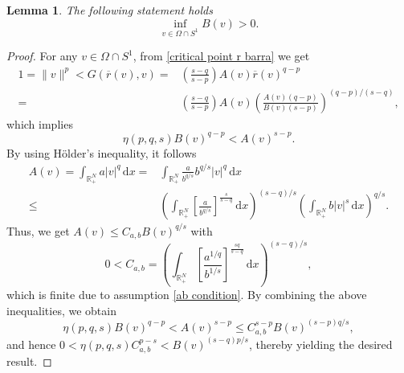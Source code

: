 \documentclass[12pt,reqno]{amsart}
\newtheorem{lemma}[theorem]{Lemma}
\begin{document}
\begin{lemma}\label{Binferior} The following statement holds
$$
\inf_{v \in \Omega\cap S^1}B(v)>0.
$$
\end{lemma}
\begin{proof}
For any $v \in \Omega\cap S^1$,
from \eqref{critical point r barra} we get
	\begin{align*}
		1=\|v\|^p<G(\overline{r}(v),v)=&\left(\frac{s-q}{s-p}\right)A(v)\overline{r}(v)^{q-p}\\
		=& \left(\frac{s-q}{s-p}\right)A(v)\left(\frac{A(v)(q-p)}{B(v)(s-p)}\right)^{(q-p)/(s-q)},
	\end{align*}
	which implies 
 $$
		\eta(p,q,s)B(v)^{q-p}<A(v)^{s-p}.
  $$
By using H\"{o}lder's inequality, it follows
	\begin{align*}
		A(v)=\int_{\mathds{R}^N_+}a|v|^q\, \mathrm{d} x
		=& \int_{\mathds{R}^N_+} \frac{a}{b^{q/s}}b^{q/s}|v|^q\, \mathrm{d} x\\
		\leq& \left(\int_{\mathds{R}^N_+} \left[\frac{a}{b^{q/s}}\right]^{\frac{s}{s-q}}\, \mathrm{d} x\right)^{(s-q)/s}\left(\int_{\mathds{R}^N_+} b|v|^s\, \mathrm{d} x\right)^{q/s}.
	\end{align*}
Thus,  we get
	$
		A(v)\leq C_{a,b}B(v)^{q/s}
	$
	with
	\[
	0<C_{a,b}=\left(\int_{\mathds{R}^N_+} \left[\frac{a^{1/q}}{b^{1/s}}\right]^{\frac{sq}{s-q}}\, \mathrm{d} x\right)^{(s-q)/s},
	\]
 which is finite due to assumption \eqref{ab condition}. By combining the above inequalities, we obtain
	\[
	\eta(p,q,s)B(v)^{q-p}<A(v)^{s-p}\leq C_{a,b}^{s-p}B(v)^{(s-p)q/s}, 
	\]
and hence 
	$
		0<\eta(p,q,s) C_{a,b}^{p-s}< B(v)^{(s-q)p/s}$,
thereby yielding the desired result.
\end{proof}
\end{document}
